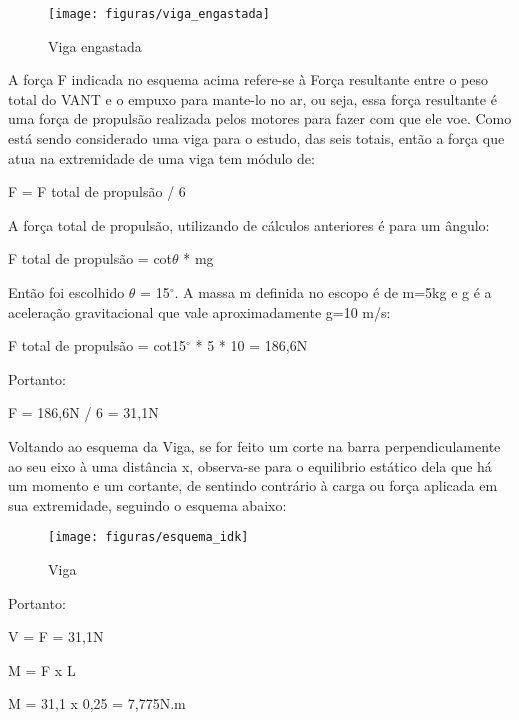 \begin{figure}[H]
\centering\texttt{[image: figuras/viga\_engastada]}
\caption{Viga engastada}
\end{figure}

A força F indicada no esquema acima refere-se à Força resultante entre o peso total do VANT e o empuxo para mante-lo no ar, ou seja, essa força resultante é uma força de propulsão realizada pelos motores para fazer com que ele voe. Como está sendo considerado uma viga para o estudo, das seis totais, então a força que atua na extremidade de uma viga tem módulo de:

\begin{center}
F = F total de propulsão / 6
\end{center}

A força total de propulsão, utilizando de cálculos anteriores é para um ângulo:

\begin{center}
F total de propulsão = cot$\theta$ * mg
\end{center}

Então foi escolhido $\theta$ = 15$^{\circ}$. A massa m definida no escopo é de m=5kg e g é a aceleração gravitacional que vale aproximadamente g=10 m/s:

\begin{center}
F total de propulsão = cot15$^{\circ}$ * 5 * 10 = 186,6N
\end{center}

Portanto:

\begin{center}
F = 186,6N / 6 = 31,1N
\end{center}

Voltando ao esquema da Viga, se for feito um corte na barra perpendiculamente ao seu eixo à uma distância x, observa-se para o equilibrio estático dela que há um momento e um cortante, de sentindo contrário à carga ou força aplicada em sua extremidade, seguindo o esquema abaixo:

\begin{figure}[H]
\centering\texttt{[image: figuras/esquema\_idk]}
\caption{Viga}
\end{figure}

Portanto:

\begin{center}
V = F = 31,1N

M = F x L

M = 31,1 x 0,25 = 7,775N.m
\end{center}

